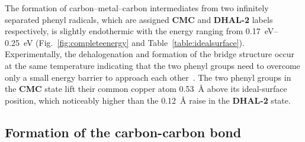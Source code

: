 \documentclass[%
 reprint,
 amsmath,amssymb,
 aps,
prb,
floatfix,
]{revtex4-2}
\newcommand{\lock}{\color{red}}
\newcommand{\lock}{\color{red}}
\begin{document}
{\lock

The formation of carbon--metal--carbon intermediates from two infinitely separated phenyl radicals, which are assigned \textbf{CMC} and \textbf{DHAL-2} labels respectively, is slightly endothermic with the energy ranging from \SIrange{0.17}{0.25}{\electronvolt} (Fig.~\ref{fig:completeenergy} and Table~\ref{table:idealsurface}). Experimentally, the dehalogenation and formation of the bridge structure occur at the same temperature indicating that the two phenyl groups need to overcome only a small energy barrier to approach each other~\cite{pccp2010}. 
%
The two phenyl groups in the \textbf{CMC} state lift their common copper atom \SI{0.53}{\angstrom} above its ideal-surface position, which noticeably higher than the \SI{0.12}{\angstrom} raise in the \textbf{DHAL-2} state.




}

\ifdefined\INTERNAL
\subsection{Formation of the carbon-carbon bond}
\fi
\end{document}

